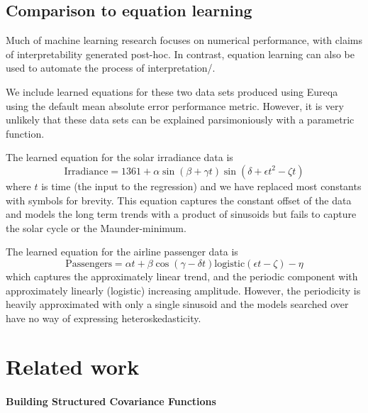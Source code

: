 \documentclass{article}
\begin{document}
\subsection{Comparison to equation learning}

Much of machine learning research focuses on numerical performance, with claims of interpretability generated post-hoc.
In contrast, equation learning \citep{Schmidt2009b} can also be used to automate the process of interpretation/.

We include learned equations for these two data sets produced using Eureqa \citep{Eureqa} using the default mean absolute error performance metric\footnotemark.
However, it is very unlikely that these data sets can be explained parsimoniously with a parametric function.

The learned equation for the solar irradiance data is
\begin{equation}
\textrm{Irradiance} = 1361 + \alpha\sin(\beta + \gamma t)\sin(\delta + \epsilon t^2 - \zeta t)
\end{equation}
where $t$ is time (the input to the regression) and we have replaced most constants with symbols for brevity.
This equation captures the constant offset of the data and models the long term trends with a product of sinusoids but fails to capture the solar cycle or the Maunder-minimum.

The learned equation for the airline passenger data is
\begin{equation}
\textrm{Passengers} = \alpha t + \beta\cos(\gamma - \delta t)\textrm{logistic}(\epsilon t - \zeta) - \eta
\end{equation}
which captures the approximately linear trend, and the periodic component with approximately linearly (logistic) increasing amplitude.
However, the periodicity is heavily approximated with only a single sinusoid and the models searched over have no way of expressing heteroskedasticity.






\section{Related work}

\paragraph{Building Structured Covariance Functions}
\end{document}
